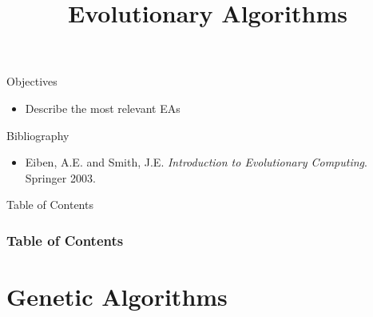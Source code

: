 \documentclass[10pt,compress]{beamer} %
\title[Evolutionary Algorithms]{Evolutionary Algorithms}
\author{}
\institute{\asignatura}
\date{}
\begin{document}
{\titlepageBlue
    \begin{frame}
        \titlepage
    \end{frame}
}

\begin{frame}[plain]{}
   \begin{block}{Objectives}
       \begin{itemize}
        \item Describe the most relevant EAs
       \end{itemize}
   \end{block}

   \begin{block}{Bibliography}
    \begin{itemize}
         \item Eiben, A.E. and Smith, J.E. \emph{Introduction to Evolutionary Computing}. Springer 2003.
	\end{itemize}
   \end{block}
\end{frame}

{
\begin{frame}[shrink]{Table of Contents}
 \frametitle{Table of Contents}
 \tableofcontents
\end{frame}
}

\section{Genetic Algorithms}
\end{document}
